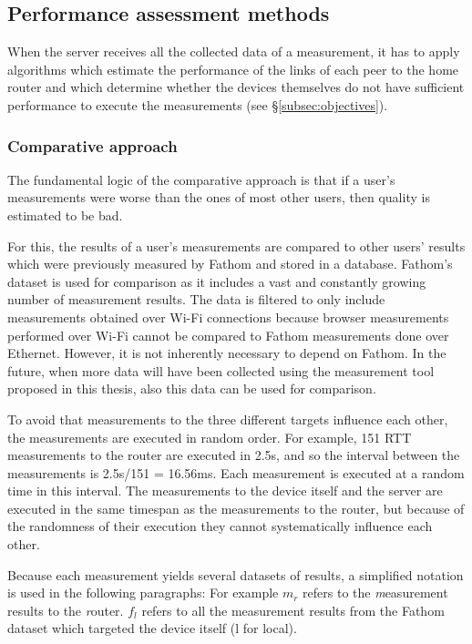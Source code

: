 \documentclass{sig-alternate-10pt}
\begin{document}
\subsection{Performance assessment methods}
\label{subsec:performancemethods}

When the server receives all the collected data of a measurement, it has to apply algorithms which estimate the performance of the links of each peer to the home router and which determine whether the devices themselves do not have sufficient performance to execute the measurements (see \S\ref{subsec:objectives}).

\subsubsection{Comparative approach}
\label{subsubsec:comparative}

The fundamental logic of the comparative approach is that if a user's measurements were worse than the ones of most other users, then quality is estimated to be bad. 

For this, the results of a user's measurements are compared to other users' results which were previously measured by Fathom and stored in a database. Fathom's dataset is used for comparison as it includes a vast and constantly growing number of measurement results. The data is filtered to only include measurements obtained over Wi-Fi connections because browser measurements performed over Wi-Fi cannot be compared to Fathom measurements done over Ethernet. However, it is not inherently necessary to depend on Fathom. In the future, when more data will have been collected using the measurement tool proposed in this thesis, also this data can be used for comparison. 

To avoid that measurements to the three different targets influence each other, the measurements are executed in random order. For example, 151 RTT measurements to the router are executed in 2.5s, and so the interval between the measurements is 2.5s/151 = 16.56ms. Each measurement is executed at a random time in this interval. The measurements to the device itself and the server are executed in the same timespan as the measurements to the router, but because of the randomness of their execution they cannot systematically influence each other. 

Because each measurement yields several datasets of results, a simplified notation is used in the following paragraphs: For example $m_r$ refers to the \textit{m}easurement results to the \textit{r}outer. $f_l$ refers to all the measurement results from the Fathom dataset which targeted the device itself (l for local). 
\end{document}
